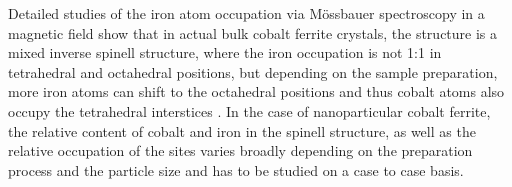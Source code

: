 \documentclass[\main/dresen_thesis.tex]{subfiles}
\begin{document}
  Detailed studies of the iron atom occupation via M\"ossbauer spectroscopy in a magnetic field show that in actual bulk cobalt ferrite crystals, the structure is a mixed inverse spinell structure, where the iron occupation is not 1:1 in tetrahedral and octahedral positions, but depending on the sample preparation, more iron atoms can shift to the octahedral positions and thus cobalt atoms also occupy the tetrahedral interstices \cite{Sawatzky_1968_Catio, Sawatzky_1969_Mossb}.
  In the case of nanoparticular cobalt ferrite, the relative content of cobalt and iron in the spinell structure, as well as the relative occupation of the sites varies broadly depending on the preparation process and the particle size \cite{Muscas_2015_Evolu, Repko_2015_Oleate, Peddis_2008_Spinc} and has to be studied on a case to case basis.
\end{document}
